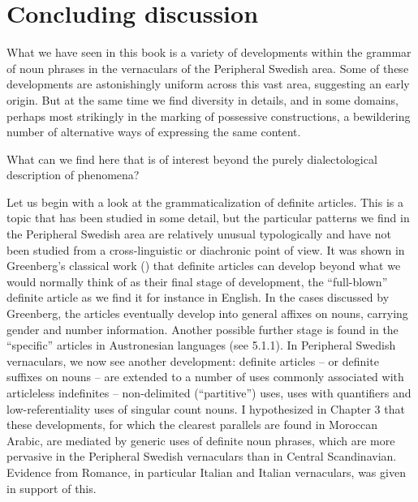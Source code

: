 \begin{figure}[h]

\begin{minipage}{7.2362in}

\end{minipage}

\end{figure}
\chapter[Concluding discussion]{Concluding discussion}

\begin{styleBodyTextFirst}
What we have seen in this book is a variety of developments within the grammar of noun phrases in the vernaculars of the Peripheral Swedish area. Some of these developments are astonishingly uniform across this vast area, suggesting an early origin. But at the same time we find diversity in details, and in some domains, perhaps most strikingly in the marking of possessive constructions, a bewildering number of alternative ways of expressing the same content. 

\end{styleBodyTextFirst}

\begin{styleBodytextC}
What can we find here that is of interest beyond the purely dialectological description of phenomena? 

\end{styleBodytextC}

\begin{styleBodytextC}
Let us begin with a look at the grammaticalization of definite articles. This is a topic that has been studied in some detail, but the particular patterns we find in the Peripheral Swedish area are relatively unusual typologically and have not been studied from a cross-linguistic or diachronic point of view. It was shown in Greenberg’s classical work (\citet{Greenberg1978}) that definite articles can develop beyond what we would normally think of as their final stage of development, the “full-blown” definite article as we find it for instance in English. In the cases discussed by Greenberg, the articles eventually develop into general affixes on nouns, carrying gender and number information. Another possible further stage is found in the “specific” articles in Austronesian languages (see 5.1.1). In Peripheral Swedish vernaculars, we now see another development: definite articles – or definite suffixes on nouns – are extended to a number of uses commonly associated with articleless indefinites – non-delimited (“partitive”) uses, uses with quantifiers and low-referentiality uses of singular count nouns. I hypothesized in Chapter 3 that these developments, for which the clearest parallels are found in Moroccan Arabic, are mediated by generic uses of definite noun phrases, which are more pervasive in the Peripheral Swedish vernaculars than in Central Scandinavian. Evidence from Romance, in particular Italian and Italian vernaculars, was given in support of this. 

\end{styleBodytextC}

